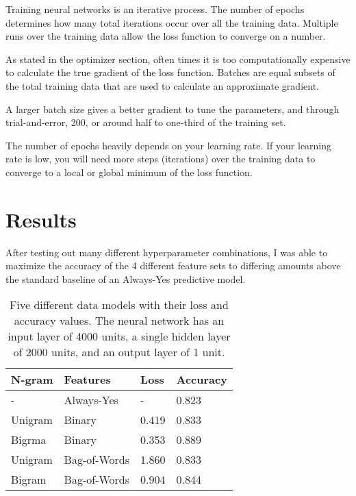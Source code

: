\documentclass[%
 reprint,
 amsmath,amssymb,
 aps,
]{revtex4-2}
\begin{document}
Training neural networks is an iterative process. The number of epochs determines how many total iterations occur over all the training data. Multiple runs over the training data allow the loss function to converge on a number.

As stated in the optimizer section, often times it is too computationally expensive to calculate the true gradient of the loss function. Batches are equal subsets of the total training data that are used to calculate an approximate gradient.

A larger batch size gives a better gradient to tune the parameters, and through trial-and-error, 200, or around half to one-third of the training set.

The number of epochs heavily depends on your learning rate. If your learning rate is low, you will need more steps (iterations) over the training data to converge to a local or global minimum of the loss function.

\section{Results}

After testing out many different hyperparameter combinations, I was able to maximize the accuracy of the 4 different feature sets to differing amounts above the standard baseline of an Always-Yes predictive model.

\begin{table}[h!]
\centering
\begin{tabular}{|p{}|p{}|p{}|p{}|} 
 \hline
 \textbf{N-gram} & \textbf{Features} & \textbf{Loss} & \textbf{Accuracy} \\
 \hline
 \hline
 - & Always-Yes & - & 0.823 \\ 
 \hline
 Unigram & Binary & 0.419 & 0.833 \\ 
 \hline
 Bigrma & Binary & 0.353 & 0.889 \\ 
 \hline
 Unigram & Bag-of-Words & 1.860 & 0.833 \\ 
 \hline
 Bigram & Bag-of-Words & 0.904 & 0.844 \\ 
 \hline
 \end{tabular}
\caption{\label{tab:table-name} Five different data models with their loss and accuracy values. The neural network has an input layer of 4000 units, a single hidden layer of 2000 units, and an output layer of 1 unit.}
\end{table}
\end{document}
